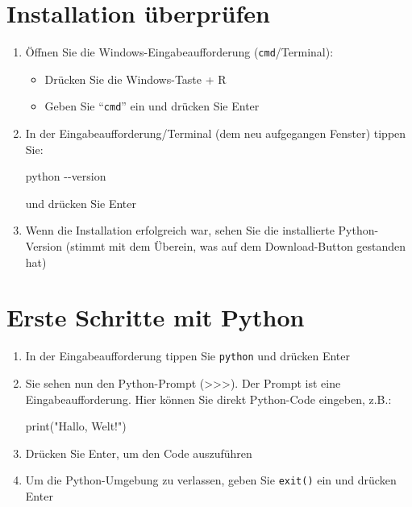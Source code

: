 \documentclass[
  nswissgerman,
  a4paper,
  DIV=11,
  numbers=noendperiod,
  ngerman]{scrreprt}
\newenvironment{Shaded}{\begin{snugshade}}{\end{snugshade}}
\newcommand{\AttributeTok}[1]{\textcolor[rgb]{0.40,0.45,0.13}{#1}}
\newcommand{\BuiltInTok}[1]{\textcolor[rgb]{0.00,0.23,0.31}{#1}}
\newcommand{\ExtensionTok}[1]{\textcolor[rgb]{0.00,0.23,0.31}{#1}}
\newcommand{\NormalTok}[1]{\textcolor[rgb]{0.00,0.23,0.31}{#1}}
\newcommand{\StringTok}[1]{\textcolor[rgb]{0.13,0.47,0.30}{#1}}
\providecommand{\tightlist}{%
  \setlength{\itemsep}{0pt}\setlength{\parskip}{0pt}}
\begin{document}
\section{Installation überprüfen}\label{installation-uxfcberpruxfcfen}

\begin{enumerate}
\def\labelenumi{\arabic{enumi}.}
\item
  Öffnen Sie die Windows-Eingabeaufforderung (\texttt{cmd}/Terminal):

  \begin{itemize}
  \tightlist
  \item
    Drücken Sie die Windows-Taste + R
  \item
    Geben Sie ``\texttt{cmd}'' ein und drücken Sie Enter
  \end{itemize}
\item
  In der Eingabeaufforderung/Terminal (dem neu aufgegangen Fenster)
  tippen Sie:

\begin{Shaded}
\begin{Highlighting}[numbers=left,,]
\ExtensionTok{python} \AttributeTok{{-}{-}version}
\end{Highlighting}
\end{Shaded}

  und drücken Sie Enter
\item
  Wenn die Installation erfolgreich war, sehen Sie die installierte
  Python-Version (stimmt mit dem Überein, was auf dem Download-Button
  gestanden hat)
\end{enumerate}

\section{Erste Schritte mit Python}\label{erste-schritte-mit-python}

\begin{enumerate}
\def\labelenumi{\arabic{enumi}.}
\item
  In der Eingabeaufforderung tippen Sie \texttt{python} und drücken
  Enter
\item
  Sie sehen nun den Python-Prompt
  (\textgreater\textgreater\textgreater). Der Prompt ist eine
  Eingabeaufforderung. Hier können Sie direkt Python-Code eingeben,
  z.B.:

\begin{Shaded}
\begin{Highlighting}[numbers=left,,]
\BuiltInTok{print}\NormalTok{(}\StringTok{"Hallo, Welt!"}\NormalTok{)}
\end{Highlighting}
\end{Shaded}
\item
  Drücken Sie Enter, um den Code auszuführen
\item
  Um die Python-Umgebung zu verlassen, geben Sie \texttt{exit()} ein und
  drücken Enter
\end{enumerate}
\end{document}
